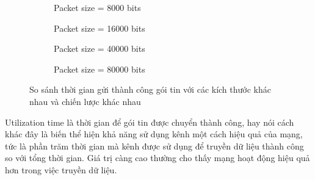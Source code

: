 \begin{figure}[h]
    \centering
    \begin{subfigure}{0.45\linewidth}
        
        \centering
        \caption{Packet size = 8000 bits}
    \end{subfigure}
    \hfill
    \begin{subfigure}{0.45\linewidth}
        \centering
        
        \caption{Packet size = 16000 bits}
    \end{subfigure}


    \begin{subfigure}{0.45\linewidth}
        \centering
        
        \caption{Packet size = 40000 bits}
    \end{subfigure}
    \hfill
    \begin{subfigure}{0.45\linewidth}
        \centering
        
        \caption{Packet size = 80000 bits}
    \end{subfigure}

    \caption{So sánh thời gian gửi thành công gói tin với các kích thước khác nhau và chiến lược khác nhau}
    \label{fig:result}
\end{figure}

Utilization time là thời gian để gói tin được chuyển thành công, hay nói cách khác đây là biến thể hiện khả năng sử dụng kênh một cách hiệu quả của mạng, tức là phần trăm thời gian mà kênh được sử dụng để truyền dữ liệu thành công so với tổng thời gian. Giá trị càng cao thường cho thấy mạng hoạt động hiệu quả hơn trong việc truyền dữ liệu.
